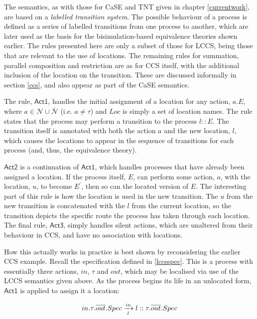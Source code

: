 The semantics, as with those for CaSE and TNT given in chapter
\ref{currentwork}, are based on a \emph{labelled transition system}.
The possible behaviour of a process is defined as a series of labelled
transitions from one process to another, which are later used as the
basis for the bisimulation-based equivalence theories shown earlier.
The rules presented here are only a subset of those for LCCS, being
those that are relevant to the use of locations.  The remaining rules
for summation, parallel composition and restriction are as for CCS
itself, with the additional inclusion of the location on the transition.
These are discussed informally in section \ref{ccs}, and also appear as
part of the CaSE semantics.  

The rule, $\textsf{Act1}$, handles the initial assignment of a
location for any action, $a.E$, where $a \in \mathcal{N} \cup
\overline{\mathcal{N}}$ (i.e. $a \ne \tau$) and $Loc$ is simply a set
of location names.  The rule states that the process may perform a
transition to the process $l::E$.  The transition itself is annotated
with both the action $a$ and the new location, $l$, which causes the
locations to appear in the sequence of transitions for each process
(and, thus, the equivalence theory).

$\textsf{Act2}$ is a continuation of $\textsf{Act1}$, which handles
processes that have already been assigned a location.  If the process
itself, $E$, can perform some action, $a$, with the location, $u$, to
become $E^\prime$, then so can the located version of $E$.  The
interesting part of this rule is how the location is used in the new
transition.  The $u$ from the new transition is concatenated with the
$l$ from the current location, so the transition depicts the specific
route the process has taken through each location.  The final rule,
$\textsf{Act3}$, simply handles silent actions, which are unaltered from their
behaviour in CCS, and have no association with locations.

How this actually works in practice is best shown by reconsidering the
earlier CCS example.  Recall the specification defined in
\ref{lccsspec}.  This is a process with essentially three actions, $in$,
$\tau$ and $\overline{out}$, which may be localised via use of the LCCS
semantics given above.  As the process begins its life in an unlocated
form, $\textsf{Act1}$ is applied to assign it a location:

\begin{equation}
in.\tau.\overline{out}.Spec \xrightarrow[l]{in}
l::\tau.\overline{out}.Spec
\end{equation}

